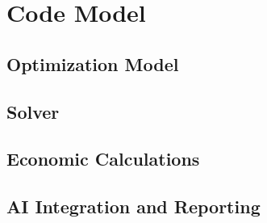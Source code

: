 \appendix

\section{Code Model}

\subsection{Optimization Model}


\subsection{Solver}


\subsection{Economic Calculations}


\subsection{AI Integration and Reporting}


